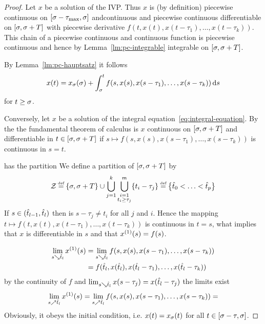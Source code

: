     \begin{proof}
        Let $x$ be a solution of the IVP. Thus $x$ is (by definition) piecewise continuous on $\compactum{\tzero-\taumax}{\tzero}$ andcontinuous and piecewise continuous differentiable on $\compactum{\tzero}{\tzero+T}$ with piecewise derivative $f(t,x(t),x(t-\tau_1),\ldots,x(t-\tau_k))$. This chain of a piecewise continuous and continuous function is piecewise continuous and hence by Lemma~\ref{lm:pc-integrable} integrable on $\compactum{\tzero}{\tzero+T}$.

        By Lemma~\ref{lm:pc-hauptsatz} it follows
        \begin{equation*}
            x(t) = x_{\tzero}(\tzero) + \integral{\tzero}{t} f(s,x(s),x(s-\tau_1),\ldots,x(s-\tau_k))\dx[s]
        \end{equation*}
        for $t\geq\tzero$.

        Conversely, let $x$ be a solution of the integral equation~\eqref{eq:integral-equation}.
        By the the fundamental theorem of calculus is $x$ continuous on $\compactum{\tzero}{\tzero+T}$ and differentiable in $t\in\compactum{\tzero}{\tzero+T}$ if $s\mapsto f(s,x(s),x(s-\tau_1),\ldots,x(s-\tau_k))$ is continuous in $s=t$.

         has the partition
        We define a partition of $\compactum{\tzero}{\tzero+T}$ by
        \begin{equation*}
            \mathcal{Z}\defeq\set{\tzero,\tzero+T}\cup\bigcup_{j=1}^{k}\bigcup_{\substack{i=1\\t_i\geq\tau_j}}^{m}\set{t_i-\tau_j}\defeq\partition{\hat{t}_0}{\hat{t}_p}
        \end{equation*}
        If $s\in\open{\hat{t}_{l-1}}{\hat{t}_l}$ then is $s-\tau_j\neq t_i$ for all $j$ and $i$. Hence the mapping $t\mapsto f(t,x(t),x(t-\tau_1),\ldots,x(t-\tau_k))$ is continuous in $t=s$, what implies that $x$ is differentiable in $s$ and that $\D{x}(s)=f(s)$.

        \begin{align*}
            \lim_{s\downto\hat{t}_l} \D{x}(s)
            &= \lim_{s\downto\hat{t}_l} f(s,x(s),x(s-\tau_1),\ldots,x(s-\tau_k))\\
            &= f(\hat{t}_l,x(\hat{t}_l),x(\hat{t}_l-\tau_1),\ldots,x(\hat{t}_l-\tau_k))
        \end{align*}
        by the continuity of $f$ and $\lim_{s\downto\hat{t}_l} x(s-\tau_j) = x(\hat{t}_l-\tau_j)$
        the limits exist
        \begin{equation*}
            \lim_{s\upto\hat{t}_l} \D{x}(s) = \lim_{s\upto\hat{t}_l} f(s,x(s),x(s-\tau_1),\ldots,x(s-\tau_k)) = 
        \end{equation*}
        Obviously, it obeys the initial condition, i.e. $x(t)=x_{\tzero}(t)$ for all $t\in\compactum{\tzero-\tau}{\tzero}$.
    \end{proof}

